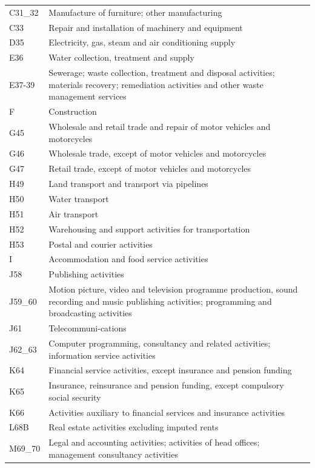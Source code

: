 \begin{table}[!htb]
{\begin{tabular}{l p{}}
		C31\_32 & Manufacture of furniture; other manufacturing \\
		C33 & Repair and installation of machinery and equipment \\
		D35 & Electricity, gas, steam and air conditioning supply \\
		E36 & Water collection, treatment and supply \\
		E37-39 & Sewerage; waste collection, treatment and disposal activities; materials recovery; remediation activities and other waste management services \\
		F & Construction \\
		G45 & Wholesale and retail trade and repair of motor vehicles and motorcycles \\
		G46 & Wholesale trade, except of motor vehicles and motorcycles \\
		G47 & Retail trade, except of motor vehicles and motorcycles \\
		H49 & Land transport and transport via pipelines \\
		H50 & Water transport \\
		H51 & Air transport \\
		H52 & Warehousing and support activities for transportation \\
		H53 & Postal and courier activities \\
		I & Accommodation and food service activities \\
		J58 & Publishing activities \\
		J59\_60 & Motion picture, video and television programme production, sound recording and music publishing activities; programming and broadcasting activities \\
		J61 & Telecommuni-cations \\
		J62\_63 & Computer programming, consultancy and related activities; information service activities \\
		K64 & Financial service activities, except insurance and pension funding \\
		K65 & Insurance, reinsurance and pension funding, except compulsory social security \\
		K66 & Activities auxiliary to financial services and insurance activities \\
		L68B & Real estate activities excluding imputed rents \\
		M69\_70 & Legal and accounting activities; activities of head offices; management consultancy activities \\

\end{tabular}}
\end{table}
